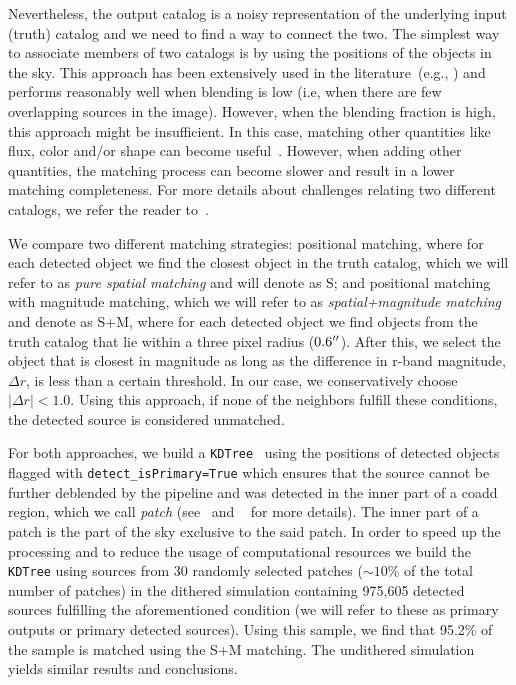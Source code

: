 \documentclass[a4paper,fleqn,usenatbib]{mnras}
\begin{document}
Nevertheless, the output catalog is a noisy representation of the underlying input (truth) catalog and we need to find a way to connect the two. 
The simplest way to associate members of two catalogs is by using the positions of the objects in the sky. This approach has been extensively used in the literature~(e.g., \citealt{1977A&AS...28..211D,1983Obs...103..150B,1986MNRAS.223..279W}) and performs reasonably well when blending is low (i.e, when there are few overlapping sources in the image). However, when the blending fraction is high, this approach might be insufficient. In this case, matching other quantities like flux, color and/or shape can become useful~\citep{2008ApJ...679..301B, doi:10.1146/annurev-statistics-010814-020231}. However, when adding other quantities, the matching process can become slower and result in a lower matching completeness. For more details about challenges relating two different catalogs, we refer the reader to~\citet{doi:10.1146/annurev-statistics-010814-020231}. 

We compare two different matching strategies: positional matching, where for each detected object we find the closest object in the truth catalog, which we will refer to as \textit{pure spatial matching} and will denote as \textsf{S}; and positional matching with magnitude matching, which we will refer to as \textit{spatial+magnitude matching} and denote as \textsf{S+M}, where for each detected object we find objects from the truth catalog that lie within a three pixel radius ($0.6 \hbox{$^{\prime\prime}$}$). After this, we select the object that is closest in magnitude as long as the difference in r-band magnitude, $\Delta r$, is less than a certain threshold. In our case, we conservatively choose $|\Delta r| < 1.0$. Using this approach, if none of the neighbors fulfill these conditions, the detected source is considered unmatched.

For both approaches, we build a \texttt{KDTree}~\citep{scikit-learn} using the positions of detected objects flagged with \texttt{detect\_isPrimary=True} which ensures that the source cannot be further deblended by the pipeline and was detected in the inner part of a coadd region, which we call \textit{patch} (see~\citet{2018PASJ...70S...5B} and ~\citet{2018PASJ...70S..25M} for more details). The inner part of a patch is the part of the sky exclusive to the said patch. In order to speed up the processing and to reduce the usage of computational resources we build the \texttt{KDTree} using sources from 30 randomly selected patches ($\sim 10\%$ of the total number of patches) in the dithered simulation containing 975,605 detected sources fulfilling the aforementioned condition (we will refer to these as primary outputs or primary detected sources). Using this sample, we find that 95.2\% of the sample is matched using the \textsf{S+M} matching. The undithered simulation yields similar results and conclusions. 
\end{document}
